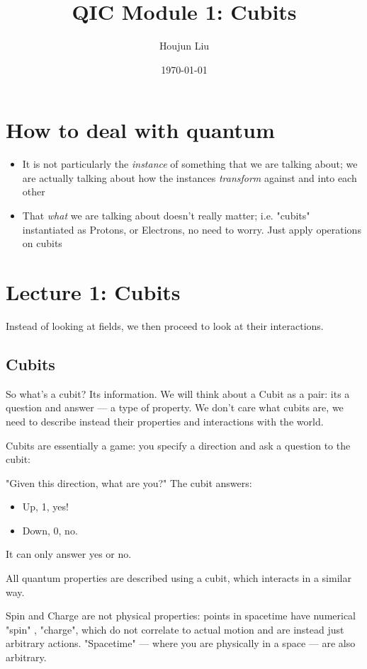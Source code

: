 \documentclass[letterpaper]{article}
\author{Houjun Liu}
\date{\today}
\title{QIC Module 1: Cubits}
\renewcommand{\tableofcontents}{}
\renewcommand\maketitle{}
\begin{document}
\maketitle
\tableofcontents


\section{How to deal with quantum}
\label{sec:org4deb7b9}
\begin{itemize}
\item It is not particularly the \emph{instance} of something that we are talking about; we are actually talking about how the instances \emph{transform} against and into each other
\item That \emph{what} we are talking about doesn't really matter; i.e. "cubits" instantiated as Protons, or Electrons, no need to worry. Just apply operations on cubits
\end{itemize}

\section{Lecture 1: Cubits}
\label{sec:orgdec5fff}
Instead of looking at fields, we then proceed to look at their interactions.

\subsection{Cubits}
\label{sec:org3757d69}
So what's a cubit? Its information. We will think about a Cubit as a pair: its a question and answer --- a type of property. We don't care what cubits are, we need to describe instead their properties and interactions with the world.

Cubits are essentially a game: you specify a direction and ask a question to the cubit:

"Given this direction, what are you?" The cubit answers:

\begin{itemize}
\item Up, 1, yes!
\item Down, 0, no.
\end{itemize}

It can only answer yes or no.

All quantum properties are described using a cubit, which interacts in a similar way.

Spin and Charge are not physical properties: points in spacetime have numerical "spin" , "charge", which do not correlate to actual motion and are instead just arbitrary actions. "Spacetime" --- where you are physically in a space --- are also arbitrary.
\end{document}
